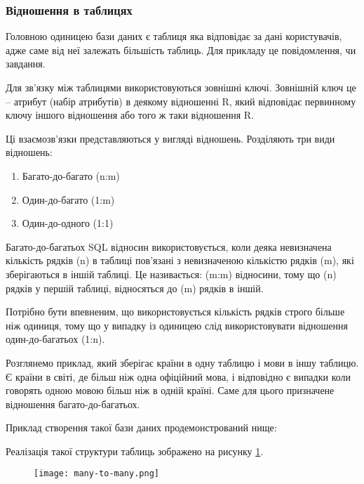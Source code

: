 \subsubsection{Відношення в таблицях}
\par Головною одиницею бази даних є таблиця яка відповідає за дані користувачів, адже саме від неї залежать більшість таблиць. Для прикладу це повідомлення, чи завдання.
\par Для зв'язку між таблицями використовуються зовнішні ключі. Зовнішній ключ це -- атрибут (набір атрибутів) в деякому відношенні R, який відповідає первинному ключу іншого відношення або того ж таки відношення R.
\par Ці взаємозв'язки представляються у вигляді відношень. Розділяють три види відношень:
\begin{enumerate}
	\item Багато-до-багато (n:m)
	\item Один-до-багато (1:m)
	\item Один-до-одного (1:1)
\end{enumerate}
\par Багато-до-багатьох SQL відносин використовується, коли деяка невизначена кількість рядків (n) в таблиці пов'язані з невизначеною кількістю рядків (m), які зберігаються в іншій таблиці. Це називається: (m:m) відносини, тому що (n) рядків у першій таблиці, відносяться до (m) рядків в іншій.
\par Потрібно бути впевненим, що використовується кількість рядків строго більше ніж одиниця, тому що у випадку із одиницею слід використовувати відношення один-до-багатьох (1:n).
\par Розглянемо приклад, який зберігає країни в одну таблицю і мови в іншу таблицю. Є країни в світі, де більш ніж одна офіційний мова, і відповідно є випадки коли говорять одною мовою більш ніж в одній країні. Саме для цього призначене відношення багато-до-багатьох. 
\par Приклад створення такої бази даних продемонстрований нище:


\par Реалізація такої структури таблиць зображено на рисунку \ref{pic:many_to_many.png}.
\begin{figure}[!ht]
\centering
		\texttt{[image: many-to-many.png]}
		\label{pic:many_to_many.png}
\end{figure}

